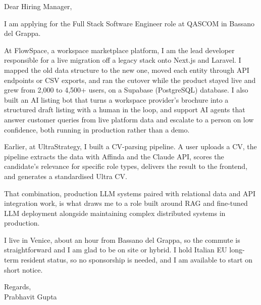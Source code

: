 \documentclass[a4paper,11pt]{article}
\begin{document}
Dear Hiring Manager,

I am applying for the Full Stack Software Engineer role at QASCOM in Bassano del Grappa.

At FlowSpace, a workspace marketplace platform, I am the lead developer responsible for a live migration off a legacy stack onto Next.js and Laravel. I mapped the old data structure to the new one, moved each entity through API endpoints or CSV exports, and ran the cutover while the product stayed live and grew from 2,000 to 4,500+ users, on a Supabase (PostgreSQL) database. I also built an AI listing bot that turns a workspace provider's brochure into a structured draft listing with a human in the loop, and support AI agents that answer customer queries from live platform data and escalate to a person on low confidence, both running in production rather than a demo.

Earlier, at UltraStrategy, I built a CV-parsing pipeline. A user uploads a CV, the pipeline extracts the data with Affinda and the Claude API, scores the candidate's relevance for specific role types, delivers the result to the frontend, and generates a standardised Ultra CV.

That combination, production LLM systems paired with relational data and API integration work, is what draws me to a role built around RAG and fine-tuned LLM deployment alongside maintaining complex distributed systems in production.

I live in Venice, about an hour from Bassano del Grappa, so the commute is straightforward and I am glad to be on site or hybrid. I hold Italian EU long-term resident status, so no sponsorship is needed, and I am available to start on short notice.

Regards,\\
Prabhavit Gupta
\end{document}
